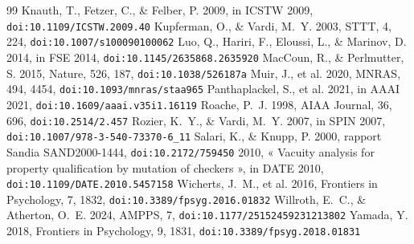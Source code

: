 \documentclass[11pt,a4paper]{article}
\begin{document}
\begin{thebibliography}{99}
 Knauth, T., Fetzer, C., \& Felber, P. 2009, in
  ICSTW 2009, \texttt{doi:10.1109/ICSTW.2009.40}
 Kupferman, O., \& Vardi, M.~Y. 2003,
  STTT, 4, 224, \texttt{doi:10.1007/s100090100062}
 Luo, Q., Hariri, F., Eloussi, L., \& Marinov, D. 2014,
  in FSE 2014, \texttt{doi:10.1145/2635868.2635920}
 MacCoun, R., \& Perlmutter, S. 2015,
  Nature, 526, 187, \texttt{doi:10.1038/526187a}
 Muir, J., et al. 2020, MNRAS, 494, 4454,
  \texttt{doi:10.1093/mnras/staa965}
 Panthaplackel, S., et al. 2021, in
  AAAI 2021, \texttt{doi:10.1609/aaai.v35i1.16119}
 Roache, P.~J. 1998, AIAA Journal, 36, 696,
  \texttt{doi:10.2514/2.457}
 Rozier, K.~Y., \& Vardi, M.~Y. 2007, in SPIN
  2007, \texttt{doi:10.1007/978-3-540-73370-6\_11}
 Salari, K., \& Knupp, P. 2000, rapport Sandia
  SAND2000-1444, \texttt{doi:10.2172/759450}
 2010, « Vacuity analysis for property
  qualification by mutation of checkers », in DATE 2010,
  \texttt{doi:10.1109/DATE.2010.5457158}
 Wicherts, J.~M., et al. 2016, Frontiers in
  Psychology, 7, 1832, \texttt{doi:10.3389/fpsyg.2016.01832}
 Willroth, E.~C., \& Atherton, O.~E.
  2024, AMPPS, 7, \texttt{doi:10.1177/25152459231213802}
 Yamada, Y. 2018, Frontiers in Psychology, 9, 1831,
  \texttt{doi:10.3389/fpsyg.2018.01831}
\end{thebibliography}
\end{document}
